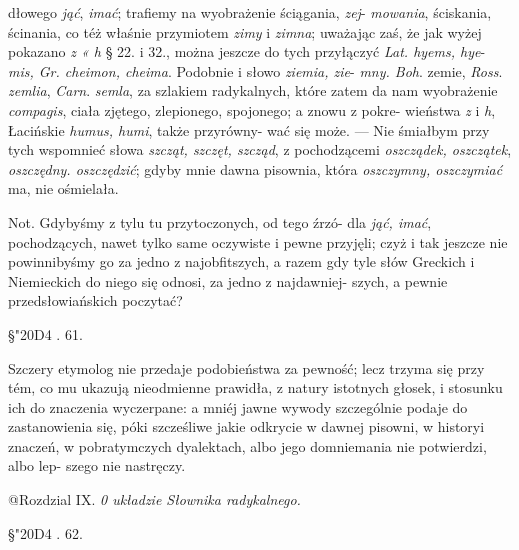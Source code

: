 
dłowego \textit{jąć}, \textit{imać}; trafiemy na wyobrażenie ściągania, \textit{zej}-
\textit{mowania}, ściskania, ścinania, co téż właśnie przymiotem
\textit{zimy} i \textit{zimna}; uważając zaś, że jak wyżej pokazano \textit{z « h} § 22.
i 32., można jeszcze do tych przyłączyć \textit{Lat. hyems, hye}-
\textit{mis, Gr. cheimon, cheima}. Podobnie i słowo \textit{ziemia, zie}-
\textit{mny. Boh}. zemie, \textit{Ross}. \textit{zemlia}, \textit{Carn}. \textit{semla}, za szlakiem
radykalnych, które zatem da nam wyobrażenie \textit{compagis},
ciała zjętego, zlepionego, spojonego; a znowu z pokre-
wieństwa \textit{z} i \textit{h}, Łacińskie \textit{humus, humi}, także przyrówny-
wać się może. --- Nie śmiałbym przy tych wspomnieć słowa
\textit{szcząt, szczęt, szcząd}, z pochodzącemi \textit{oszcządek, oszczątek},
\textit{oszczędny. oszczędzić}; gdyby mnie dawna pisownia, która
\textit{oszczymny, oszczymiać} ma, nie ośmielała.


Not. Gdybyśmy z tylu tu przytoczonych, od tego źrzó-
dla \textit{jąć, imać}, pochodzących, nawet tylko same oczywiste
i pewne przyjęli; czyż i tak jeszcze nie powinnibyśmy go za
jedno z najobfitszych, a razem gdy tyle słów Greckich i
Niemieckich do niego się odnosi, za jedno z najdawniej-
szych, a pewnie przedsłowiańskich poczytać? 


\begin{center}
§\char"20D4 . 61. \\
\end{center}

Szczery etymolog nie przedaje podobieństwa za pewność;
lecz trzyma się przy tém, co mu ukazują nieodmienne
prawidła, z natury istotnych głosek, i stosunku ich do
znaczenia wyczerpane: a mniéj jawne wywody szczególnie
podaje do zastanowienia się, póki szcześliwe jakie odkrycie
w dawnej pisowni, w historyi znaczeń, w pobratymczych
dyalektach, albo jego domniemania nie potwierdzi, albo lep-
szego nie nastręczy. 


\begin{center}
@{Rozdzial IX.} 
\textit{0 układzie Słownika radykalnego.} 
\end{center}

\begin{center}
§\char"20D4 . 62. \\
\end{center} 


